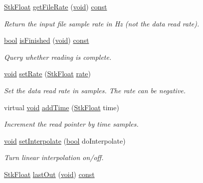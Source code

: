 \begin{DoxyCompactItemize}
\hyperlink{namespace_nyq_a044fa20a706520a617bbbf458a7db7e4}{Stk\+Float} \hyperlink{class_nyq_1_1_file_wv_in_a7690d063006b348f638df4b2dd7cecc2}{get\+File\+Rate} (\hyperlink{sound_8c_ae35f5844602719cf66324f4de2a658b3}{void}) \hyperlink{getopt1_8c_a2c212835823e3c54a8ab6d95c652660e}{const} 
\begin{DoxyCompactList}\small\item\em Return the input file sample rate in Hz (not the data read rate). \end{DoxyCompactList}\item 
\hyperlink{mac_2config_2i386_2lib-src_2libsoxr_2soxr-config_8h_abb452686968e48b67397da5f97445f5b}{bool} \hyperlink{class_nyq_1_1_file_wv_in_a521cd86d12af11a73d0ab854c7ed82f8}{is\+Finished} (\hyperlink{sound_8c_ae35f5844602719cf66324f4de2a658b3}{void}) \hyperlink{getopt1_8c_a2c212835823e3c54a8ab6d95c652660e}{const} 
\begin{DoxyCompactList}\small\item\em Query whether reading is complete. \end{DoxyCompactList}\item 
\hyperlink{sound_8c_ae35f5844602719cf66324f4de2a658b3}{void} \hyperlink{class_nyq_1_1_file_wv_in_ae9fd99ac7e6aa390869996b9b9eabf26}{set\+Rate} (\hyperlink{namespace_nyq_a044fa20a706520a617bbbf458a7db7e4}{Stk\+Float} \hyperlink{seqread_8c_ad89d3fac2deab7a9cf6cfc8d15341b85}{rate})
\begin{DoxyCompactList}\small\item\em Set the data read rate in samples. The rate can be negative. \end{DoxyCompactList}\item 
virtual \hyperlink{sound_8c_ae35f5844602719cf66324f4de2a658b3}{void} \hyperlink{class_nyq_1_1_file_wv_in_a1fa7e24cba23bd7a5ee2c505af9098bc}{add\+Time} (\hyperlink{namespace_nyq_a044fa20a706520a617bbbf458a7db7e4}{Stk\+Float} time)
\begin{DoxyCompactList}\small\item\em Increment the read pointer by {\itshape time} samples. \end{DoxyCompactList}\item 
\hyperlink{sound_8c_ae35f5844602719cf66324f4de2a658b3}{void} \hyperlink{class_nyq_1_1_file_wv_in_a8483272b3cfba15faf0abe6bc413226a}{set\+Interpolate} (\hyperlink{mac_2config_2i386_2lib-src_2libsoxr_2soxr-config_8h_abb452686968e48b67397da5f97445f5b}{bool} do\+Interpolate)
\begin{DoxyCompactList}\small\item\em Turn linear interpolation on/off. \end{DoxyCompactList}\item 
\hyperlink{namespace_nyq_a044fa20a706520a617bbbf458a7db7e4}{Stk\+Float} \hyperlink{class_nyq_1_1_file_wv_in_af1be20eae08480b3a8df0e2e9f8f36af}{last\+Out} (\hyperlink{sound_8c_ae35f5844602719cf66324f4de2a658b3}{void}) \hyperlink{getopt1_8c_a2c212835823e3c54a8ab6d95c652660e}{const} 
\end{DoxyCompactItemize}
